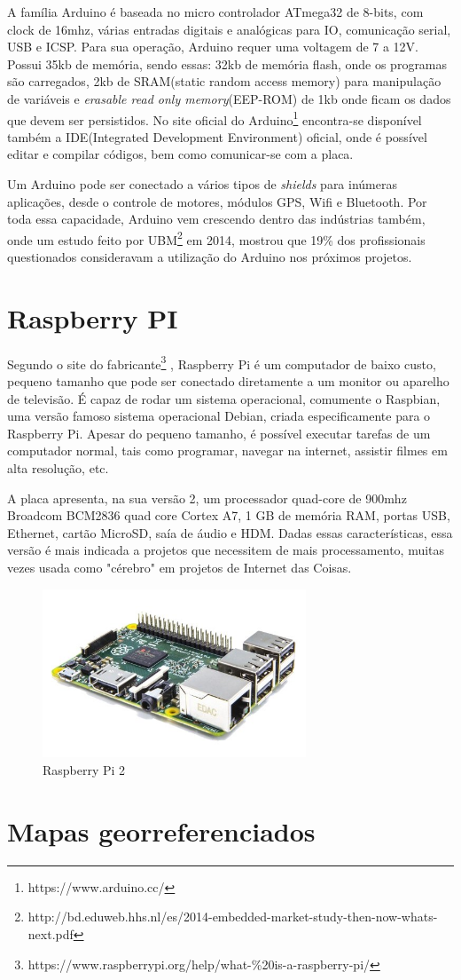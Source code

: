 A família Arduino é baseada no micro controlador ATmega32 de 8-bits, com clock de 16mhz, várias entradas digitais e analógicas para IO, comunicação serial, USB e ICSP. Para sua operação, Arduino requer uma voltagem de 7 a 12V. Possui 35kb de memória, sendo essas: 32kb de memória flash, onde os programas são carregados, 2kb de SRAM(static random access memory) para manipulação de variáveis e \textit{erasable read only memory}(EEP-ROM) de 1kb  onde ficam os dados que devem ser persistidos. No site oficial do Arduino\footnote{https://www.arduino.cc/} encontra-se disponível também a IDE(Integrated Development Environment) oficial, onde é possível editar e compilar códigos, bem como comunicar-se com a placa.

Um Arduino pode ser conectado a vários tipos de \textit{shields} para inúmeras aplicações, desde o controle de motores, módulos GPS, Wifi e Bluetooth. Por toda essa capacidade, Arduino vem crescendo dentro das indústrias também, onde um estudo feito por UBM\footnote{http://bd.eduweb.hhs.nl/es/2014-embedded-market-study-then-now-whats-next.pdf} em 2014, mostrou que 19\% dos profissionais questionados consideravam a utilização do Arduino nos próximos projetos.
\section{Raspberry PI}

Segundo o site do fabricante\footnote{https://www.raspberrypi.org/help/what-\%20is-a-raspberry-pi/} , Raspberry Pi é um computador de baixo custo, pequeno tamanho que pode ser conectado diretamente a um monitor ou aparelho de televisão. É capaz de rodar um sistema operacional, comumente o Raspbian, uma versão famoso sistema operacional Debian, criada especificamente para o Raspberry Pi. Apesar do pequeno tamanho, é possível executar tarefas de um computador normal, tais como programar, navegar na internet, assistir filmes em alta resolução, etc. 

A placa apresenta, na sua versão 2, um processador quad-core de 900mhz  Broadcom BCM2836 quad core Cortex A7, 1 GB de memória RAM, portas USB, Ethernet, cartão MicroSD, saía de áudio e HDM. Dadas essas características, essa versão é mais indicada a projetos que necessitem de mais processamento, muitas vezes usada como "cérebro" em projetos de Internet das Coisas.

\begin{figure}[H]
    \centering
    \includegraphics[width=0.7\textwidth]{figuras/raspberrypi2.jpg}
    \caption{Raspberry Pi 2}
    \label{fig:raspberry-pi}
\end{figure}

\section{Mapas georreferenciados}